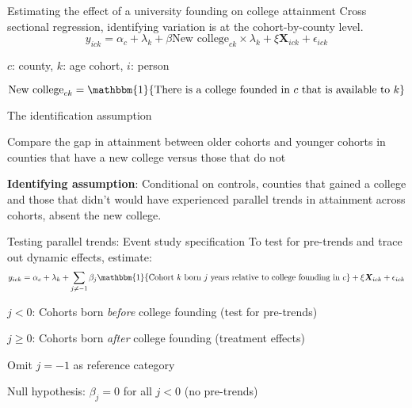\documentclass[notes,11pt, aspectratio=169]{beamer}
\newenvironment{wideitemize}{\itemize\addtolength{\itemsep}{10pt}}{\enditemize}
\begin{document}
\begin{frame}{Estimating the effect of a university founding on college attainment}
  Cross sectional regression, identifying variation is at the cohort-by-county level.
  \begin{equation}
    y_{ick} = \alpha_c + \lambda_k + \beta \text{New college}_{ck}\times \lambda_k +\xi \bm{X}_{ick} + \epsilon_{ick}
  \end{equation}
  \begin{wideitemize}
    \item $c$: county, $k$: age cohort, $i$: person
    \item $\text{New college}_{ck} = \mathbbm{1}\{\text{There is a college founded in $c$ that is available to $k$}\}$
  \end{wideitemize}
\end{frame}

\begin{frame}{The identification assumption}
\begin{wideitemize}
  \item Compare the gap in attainment between older cohorts and younger cohorts in counties that have a new college versus those that do not
  \item \textbf{Identifying assumption}: Conditional on controls, counties that gained a college and those that didn't would have experienced parallel trends in attainment across cohorts, absent the new college.
\end{wideitemize}
\end{frame}

\begin{frame}{Testing parallel trends: Event study specification}
  To test for pre-trends and trace out dynamic effects, estimate:
  \begin{equation}
    y_{ick} = \alpha_c + \lambda_k + \sum_{j \neq -1} \beta_j \mathbbm{1}\{\text{Cohort } k \text{ born } j \text{ years relative to college founding in } c\} + \xi \bm{X}_{ick} + \epsilon_{ick}
  \end{equation}
  \begin{wideitemize}
    \item $j < 0$: Cohorts born \textit{before} college founding (test for pre-trends)
    \item $j \geq 0$: Cohorts born \textit{after} college founding (treatment effects)
    \item Omit $j = -1$ as reference category
    \item Null hypothesis: $\beta_j = 0$ for all $j < 0$ (no pre-trends)
  \end{wideitemize}
\end{frame}
\end{document}
